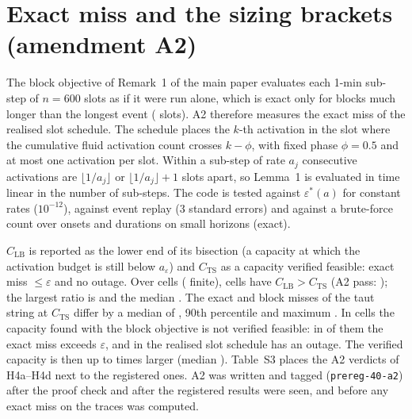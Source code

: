 \documentclass[10pt]{article}
\newcommand{\eps}{\varepsilon}
\begin{document}
\section{Exact miss and the sizing brackets (amendment A2)}
The block objective of Remark~1 of the main paper evaluates each 1-min sub-step of $n=600$ slots as if it were run alone, which is exact only for blocks much longer than the longest event (\Dmax{} slots). A2 therefore measures the exact miss of the realised slot schedule. The schedule places the $k$-th activation in the slot where the cumulative fluid activation count crosses $k-\phi$, with fixed phase $\phi=0.5$ and at most one activation per slot. Within a sub-step of rate $a_j$ consecutive activations are $\lfloor1/a_j\rfloor$ or $\lfloor1/a_j\rfloor+1$ slots apart, so Lemma~1 is evaluated in time linear in the number of sub-steps. The code is tested against $\eps^*(a)$ for constant rates ($10^{-12}$), against event replay (3 standard errors) and against a brute-force count over onsets and durations on small horizons (exact).

$C_{\mathrm{LB}}$ is reported as the lower end of its bisection (a capacity at which the activation budget is still below $a_\eps$) and $C_{\mathrm{TS}}$ as a capacity verified feasible: exact miss $\le\eps$ and no outage. Over \AiiNcells{} cells (\AiiNfinite{} finite), \AiiNviol{} cells have $C_{\mathrm{LB}}>C_{\mathrm{TS}}$ (A2 pass: \AiiPass); the largest ratio is \AiiMaxLBTS{} and the median \AiiMedLBTS. The exact and block misses of the taut string at $C_{\mathrm{TS}}$ differ by a median of \AiiAbsMed{}, 90th percentile \AiiAbsPninety{} and maximum \AiiAbsMax. In \AiiNsurBad{} cells the capacity found with the block objective is not verified feasible: in \AiiNsurBadMiss{} of them the exact miss exceeds $\eps$, and in \AiiNsurBadOut{} the realised slot schedule has an outage. The verified capacity is then up to \AiiTSbadMax{} times larger (median \AiiTSbadMed). Table~S3 places the A2 verdicts of H4a--H4d next to the registered ones. A2 was written and tagged (\texttt{prereg-40-a2}) after the proof check and after the registered results were seen, and before any exact miss on the traces was computed.
\end{document}
